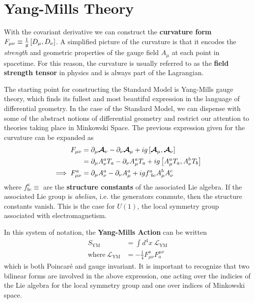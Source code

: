 \section{Yang-Mills Theory}
With the covariant derivative we can construct the \textbf{curvature form} $F_{\mu\nu} \equiv \frac{1}{g}  \left[ {D_\mu},{D_\nu} \right] $.
A simplified picture of the curvature is that it encodes the \textit{strength} and geometric properties of the gauge field $A_\mu$ at each point in spacetime.
For this reason, the curvature is usually referred to as the \textbf{field strength tensor} in physics and is always part of the Lagrangian.

The starting point for constructing the Standard Model is Yang-Mills gauge theory, which finds its fullest and most beautiful expression in the language of differential geometry.
In the case of the Standard Model, we can dispense with some of the abstract notions of differential geometry and restrict our attention to theories taking place in Minkowski Space.
The previous expression given for the curvature can be expanded as
\begin{align}
    F_{\mu\nu} &= \partial_\mu  \boldsymbol{\mathcal{A}} _\nu - \partial_\nu  \boldsymbol{\mathcal{A}} _\mu + ig \left[ { \boldsymbol{\mathcal{A}} _\mu},{ \boldsymbol{\mathcal{A}} _\nu} \right] \\
    &= \partial_\mu A_\nu^aT_a - \partial_\nu A_\mu^aT_a + ig \left[ {A_\mu^aT_a},{A_\nu^bT_b} \right] \\
    \implies F_{\mu\nu}^a &= \partial_\mu A_\nu^a - \partial_\nu A_\mu^a + igf^a_{\ bc}A_\mu^bA_\nu^c
\end{align}
where $f^a_{bc} \equiv $ are the \textbf{structure constants} of the associated Lie algebra.
If the associated Lie group is \textit{abelian}, i.e. the generators commute, then the structure constants vanish.
This is the case for $U(1)$, the local symmetry group associated with electromagnetism.

In this system of notation, the \textbf{Yang-Mills Action} can be written
\newcommand{\YML}{ \ensuremath{ \mathcal{L}_{\mathrm{YM}} } }
\begin{align}
    S_{\mathrm{YM}} &= \int d^4x\ \YML\\
    \mathrm{where}\ \YML &= -\frac{1}{4} F_{\mu\nu}^a F^{\mu\nu}_a
\end{align}
which is both Poincar\'{e} and gauge invariant. It is important to recognize that two bilinear forms are involved in the above expression, one acting over the indicies of the Lie algebra for the local symmetry group and one over indices of Minkowski space.

